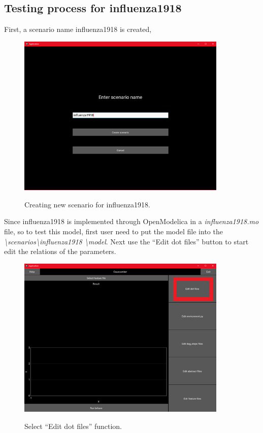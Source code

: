 \subsection{Testing process for influenza1918}
First, a scenario name influenza1918 is created, 
\begin{figure}[H]
	\centering
	\includegraphics[width=10cm]{figures/influenzaTestProcess1.png}\\
	\caption{Creating new scenario for influenza1918.}
	\label{fig:figure19}
\end{figure}
Since influenza1918 is implemented through OpenModelica in a \textsl{influenza1918.mo} file, so to test this model, first user need to put the model file into the \textsl{\textbackslash scenarios\textbackslash influenza1918 \textbackslash model}. Next use the “Edit dot files” button to start edit the relations of the parameters.
\begin{figure}[H]
	\centering
	\includegraphics[width=10cm]{figures/influenzaTestProcess2.png}\\
	\caption{Select “Edit dot files” function.}
	\label{fig:figure20}
\end{figure}
